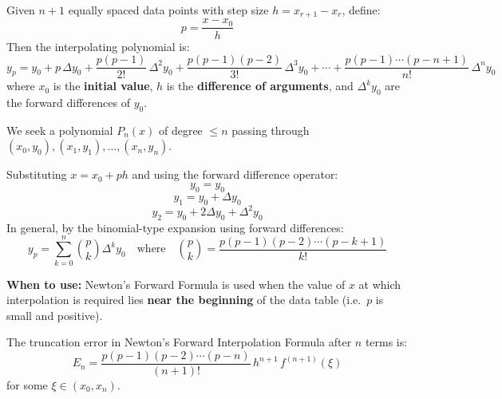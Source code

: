 \documentclass[12pt]{article}
\begin{document}
\bigskip

\begin{defbox}
Given $n+1$ equally spaced data points with step size $h = x_{r+1}-x_r$, define:
\[
  p = \frac{x - x_0}{h}
\]
Then the interpolating polynomial is:
\[
  \boxed{y_p = y_0 + p\,\Delta y_0 + \frac{p(p-1)}{2!}\,\Delta^2 y_0 + \frac{p(p-1)(p-2)}{3!}\,\Delta^3 y_0 + \cdots + \frac{p(p-1)\cdots(p-n+1)}{n!}\,\Delta^n y_0}
\]
where $x_0$ is the \textbf{initial value}, $h$ is the \textbf{difference of arguments}, and $\Delta^k y_0$ are the forward differences of $y_0$.
\end{defbox}

\bigskip

\begin{derivbox}
We seek a polynomial $P_n(x)$ of degree $\leq n$ passing through $(x_0,y_0),(x_1,y_1),\ldots,(x_n,y_n)$.

Substituting $x = x_0 + ph$ and using the forward difference operator:
\[
  y_0 = y_0
\]
\[
  y_1 = y_0 + \Delta y_0
\]
\[
  y_2 = y_0 + 2\Delta y_0 + \Delta^2 y_0
\]
In general, by the binomial-type expansion using forward differences:
\[
  y_p = \sum_{k=0}^{n}\binom{p}{k}\Delta^k y_0
  \quad\text{where}\quad
  \binom{p}{k} = \frac{p(p-1)(p-2)\cdots(p-k+1)}{k!}
\]
\end{derivbox}

\bigskip

\begin{keybox}
\textbf{When to use:} Newton's Forward Formula is used when the value of $x$ at which interpolation is required lies \textbf{near the beginning} of the data table (i.e.\ $p$ is small and positive).
\end{keybox}

\bigskip

\begin{thmbox}
The truncation error in Newton's Forward Interpolation Formula after $n$ terms is:
\[
  E_n = \frac{p(p-1)(p-2)\cdots(p-n)}{(n+1)!}\,h^{n+1}\,f^{(n+1)}(\xi)
\]
for some $\xi \in (x_0, x_n)$.
\end{thmbox}

\bigskip
\end{document}
